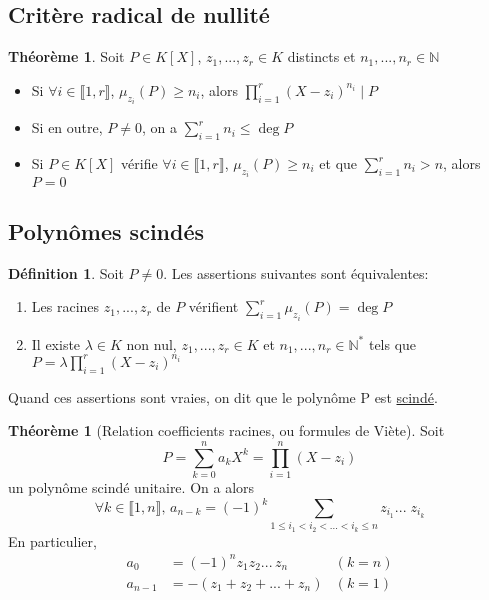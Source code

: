 \documentclass[10pt,a4paper]{article}
\theoremstyle{definition}
\newtheorem{theorem}[proposition]{Théorème}
\newtheorem{definition}[proposition]{Définition}
\begin{document}
\subsection{Critère radical de nullité}
\begin{theorem}
Soit $P \in K[X]$, $z_1, ... , z_r \in K$ distincts et $n_1, ... ,n_r \in \mathbb{N}$
\begin{itemize}
\item Si $\forall i \in \llbracket 1, r \rrbracket$, $\mu_{z_i}(P) \geq n_i$, alors $\prod\limits_{i = 1}^r (X - z_i)^{n_i} \mid P$
\item Si en outre, $P \neq 0$, on a $\sum\limits_{i=1}^r n_i \leq \deg{P}$
\item Si $P \in K[X]$ vérifie $\forall i \in \llbracket 1, r \rrbracket$, $\mu_{z_i}(P) \geq n_i$ et que $\sum\limits_{i = 1}^r n_i > n$, alors $P = 0$
\end{itemize}
\end{theorem}

\subsection{Polynômes scindés}
\begin{definition}
Soit $P \neq 0$. Les assertions suivantes sont équivalentes:
\begin{enumerate}
\item Les racines $z_1, ... , z_r$ de $P$ vérifient $\sum\limits_{i=1}^r \mu_{z_i}(P) = \deg{P}$
\item Il existe $\lambda \in K$ non nul, $z_1, ... , z_r \in K$ et $n_1, ... , n_r \in \mathbb{N}^*$ tels que $P = \lambda \prod\limits_{i=1}^r (X - z_i)^{n_i}$
\end{enumerate}
Quand ces assertions sont vraies, on dit que le polynôme P est \uline{scindé}.
\end{definition}

\pagebreak

\begin{theorem}[Relation coefficients racines, ou formules de Viète]
Soit
\[P = \sum\limits_{k = 0}^{n} a_k X^k = \prod\limits_{i = 1}^{n} (X - z_i)\]
un polynôme scindé unitaire. On a alors
\[\forall k \in \llbracket 1, n \rrbracket ,\, a_{n - k} = (-1)^k \sum\limits_{1 \leq i_1 < i_2 < ... < i_k \leq n} z_{i_1} ... \; z_{i_k}\]
En particulier,
\begin{align*}
a_0 &= (-1)^n z_1 z_2 ...\, z_n &(k = n) \\ 
a_{n-1} &= -(z_1 + z_2 + ... + z_n) &(k = 1)
\end{align*}
\end{theorem}
\end{document}

